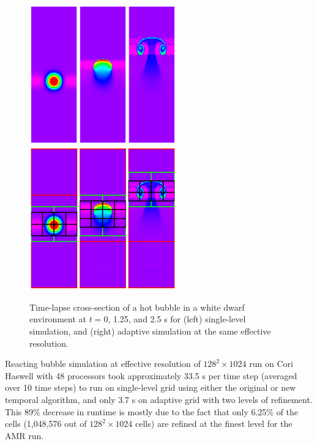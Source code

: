 \begin{figure}[htb]
\begin{center}
\includegraphics[width=2.5in]{./figs/reacting_bubble_result} \hspace{2.5em}
\includegraphics[width=2.5in]{./figs/reacting_bubble_amr_result}
\caption{\label{fig:bubble_results} Time-lapse cross-section of a hot bubble in a white dwarf environment at 
         $t = 0$, 1.25, and 2.5 s for (left) single-level simulation, and 
         (right) adaptive simulation at the same effective resolution.}
\end{center}
\end{figure}

Reacting bubble simulation at effective resolution of $128^2 \times 1024$ run on Cori Haswell with 48 processors took approximately 33.5 s per time step (averaged over 10 time steps) to run on single-level grid using either the original or new temporal algorithm, and only 3.7 s on adaptive grid with two levels of refinement. This 89\% decrease in runtime is mostly due to the fact that only 6.25\% of the cells (1,048,576 out of $128^2 \times 1024$ cells) are refined at the finest level for the AMR run. 


